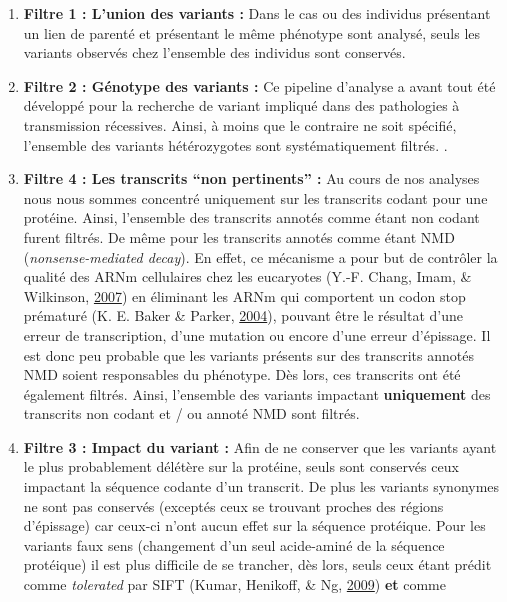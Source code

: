 \documentclass[12pt,twoside]{reedthesis}
\theoremstyle{definition}
\theoremstyle{definition}
\theoremstyle{remark}
\begin{document}
  \begin{enumerate}
  \def\labelenumi{\arabic{enumi}.}
  \item
    \textbf{Filtre 1 : L'union des variants :} Dans le cas ou des
    individus présentant un lien de parenté et présentant le même
    phénotype sont analysé, seuls les variants observés chez l'ensemble
    des individus sont conservés.
  \item
    \textbf{Filtre 2 : Génotype des variants :} Ce pipeline d'analyse a
    avant tout été développé pour la recherche de variant impliqué dans
    des pathologies à transmission récessives. Ainsi, à moins que le
    contraire ne soit spécifié, l'ensemble des variants hétérozygotes sont
    systématiquement filtrés. .
  \item
    \textbf{Filtre 4 : Les transcrits ``non pertinents'' :} Au cours de
    nos analyses nous nous sommes concentré uniquement sur les transcrits
    codant pour une protéine. Ainsi, l'ensemble des transcrits annotés
    comme étant non codant furent filtrés. De même pour les transcrits
    annotés comme étant NMD (\emph{nonsense-mediated decay}). En effet, ce
    mécanisme a pour but de contrôler la qualité des ARNm cellulaires chez
    les eucaryotes (Y.-F. Chang, Imam, \& Wilkinson,
    \protect\hyperlink{ref-Chang2007}{2007}) en éliminant les ARNm qui
    comportent un codon stop prématuré (K. E. Baker \& Parker,
    \protect\hyperlink{ref-Baker2004}{2004}), pouvant être le résultat
    d'une erreur de transcription, d'une mutation ou encore d'une erreur
    d'épissage. Il est donc peu probable que les variants présents sur des
    transcrits annotés NMD soient responsables du phénotype. Dès lors, ces
    transcrits ont été également filtrés. Ainsi, l'ensemble des variants
    impactant \textbf{uniquement} des transcrits non codant et / ou annoté
    NMD sont filtrés.
  \item
    \textbf{Filtre 3 : Impact du variant :} Afin de ne conserver que les
    variants ayant le plus probablement délétère sur la protéine, seuls
    sont conservés ceux impactant la séquence codante d'un transcrit. De
    plus les variants synonymes ne sont pas conservés (exceptés ceux se
    trouvant proches des régions d'épissage) car ceux-ci n'ont aucun effet
    sur la séquence protéique. Pour les variants faux sens (changement
    d'un seul acide-aminé de la séquence protéique) il est plus difficile
    de se trancher, dès lors, seuls ceux étant prédit comme
    \emph{tolerated} par SIFT (Kumar, Henikoff, \& Ng,
    \protect\hyperlink{ref-Kumar2009}{2009}) \textbf{et} comme

\end{enumerate}
\end{document}
